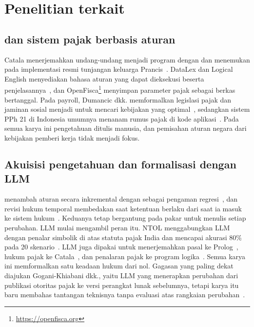 \section{Penelitian terkait}
\label{sec:terkait}

\subsection{ dan sistem pajak berbasis aturan}
Catala menerjemahkan undang-undang menjadi program dengan  dan menemukan  pada implementasi resmi tunjangan keluarga Prancis~\cite{merigoux2021catala}. DataLex dan Logical English menyediakan bahasa aturan yang dapat dieksekusi beserta penjelasannya~\cite{mowbray2023scaling,kowalski2022logicalenglish}, dan OpenFisca\footnote{\url{https://openfisca.org}} menyimpan parameter pajak sebagai berkas bertanggal. Pada payroll, Dumancic dkk. memformalkan legislasi pajak dan jaminan sosial menjadi  untuk mencari kebijakan yang optimal~\cite{dumancic2021payroll}, sedangkan sistem PPh 21 di Indonesia umumnya menanam rumus pajak di kode aplikasi~\cite{ramadhani2021grossup,kusuma2026pph21}. Pada semua karya ini pengetahuan ditulis manusia, dan pemisahan aturan negara dari kebijakan pemberi kerja tidak menjadi fokus.

\subsection{Akuisisi pengetahuan dan formalisasi dengan LLM}
 menambah aturan secara inkremental dengan  sebagai pengaman regresi~\cite{compton2021rippledown}, dan revisi hukum temporal membedakan saat ketentuan berlaku dari saat ia masuk ke sistem hukum~\cite{moguillansky2024temporalised}. Keduanya tetap bergantung pada pakar untuk menulis setiap perubahan. LLM mulai mengambil peran itu. NTOL menggabungkan LLM dengan penalar simbolik di atas  statuta pajak India dan mencapai akurasi 80\% pada 20 skenario~\cite{veeramani2026neurosymbolic}. LLM juga dipakai untuk menerjemahkan pasal  ke Prolog~\cite{yadamsuren2026formalization}, hukum pajak ke Catala~\cite{lorenzo2025translating}, dan penalaran pajak ke program logika~\cite{jurayj2026tax}. Semua karya ini memformalkan satu keadaan hukum dari nol. Gagasan yang paling dekat diajukan Gogani-Khiabani dkk., yaitu LLM yang menerapkan perubahan dari publikasi otoritas pajak ke versi perangkat lunak sebelumnya, tetapi karya itu baru membahas tantangan teknisnya tanpa evaluasi atas rangkaian perubahan~\cite{goganikhiabani2025maintaining}.

